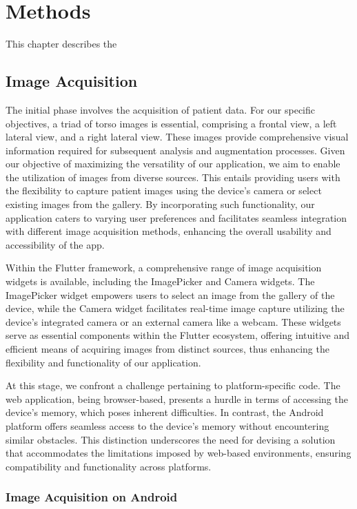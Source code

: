 \chapter{Methods}

This chapter describes the 

\section{Image Acquisition}

The initial phase involves the acquisition of patient data. For our specific objectives, a triad of torso images is essential, comprising a frontal view, a left lateral view, and a right lateral view. 
These images provide comprehensive visual information required for subsequent analysis and augmentation processes. Given our objective of maximizing the versatility of our application, 
we aim to enable the utilization of images from diverse sources. This entails providing users with the flexibility to capture patient images using the device's camera or select existing images from the gallery. 
By incorporating such functionality, our application caters to varying user preferences and facilitates seamless integration with different image acquisition methods, 
enhancing the overall usability and accessibility of the app.

Within the Flutter framework, a comprehensive range of image acquisition widgets is available, including the ImagePicker and Camera widgets. 
The ImagePicker widget empowers users to select an image from the gallery of the device, while the Camera widget facilitates real-time image capture utilizing the device's integrated camera 
or an external camera like a webcam. These widgets serve as essential components within the Flutter ecosystem, offering intuitive and efficient means of acquiring images from distinct sources, 
thus enhancing the flexibility and functionality of our application.

At this stage, we confront a challenge pertaining to platform-specific code. The web application, being browser-based, presents a hurdle in terms of accessing the device's memory, 
which poses inherent difficulties. In contrast, the Android platform offers seamless access to the device's memory without encountering similar obstacles. 
This distinction underscores the need for devising a solution that accommodates the limitations imposed by web-based environments, ensuring compatibility and functionality across platforms.

\subsection{Image Acquisition on Android}

